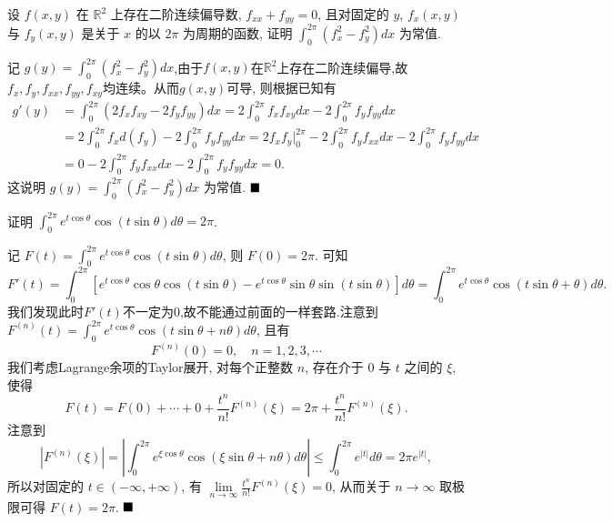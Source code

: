 \documentclass[lang=cn,newtx,10pt,scheme=chinese]{elegantbook}
\begin{document}
\begin{example}
设 $f(x, y)$ 在 $\mathbb{R}^2$ 上存在二阶连续偏导数, $f_{xx} + f_{yy} = 0$, 且对固定的 $y$, $f_x(x, y)$ 与 $f_y(x, y)$ 是关于 $x$ 的以 $2\pi$ 为周期的函数, 证明 $\int_{0}^{2\pi} (f_x^2 - f_y^2) dx$ 为常值.
\end{example}

\begin{solution}
记 $g(y) = \int_{0}^{2\pi} (f_x^2 - f_y^2) dx$,由于$f(x,y)$在$\mathbb R^2$上存在二阶连续偏导,故$f_x,f_y,f_{xx},f_{yy},f_{xy}$均连续。从而$g(x,y)$可导,
 则根据已知有
\begin{align*}
g'(y) &= \int_{0}^{2\pi} (2f_x f_{xy} - 2f_y f_{yy}) dx = 2 \int_{0}^{2\pi} f_x f_{xy} dx - 2 \int_{0}^{2\pi} f_y f_{yy} dx \\
&= \boxed{2 \int_{0}^{2\pi} f_x d(f_y)} - 2 \int_{0}^{2\pi} f_y f_{yy} dx = \boxed{2f_x f_y \Big|_{0}^{2\pi}} - 2 \int_{0}^{2\pi} f_y f_{xx} dx - 2 \int_{0}^{2\pi} f_y f_{yy} dx \\
&= 0 - 2 \int_{0}^{2\pi} f_y f_{xx} dx - 2 \int_{0}^{2\pi} f_y f_{yy} dx = 0.
\end{align*}
这说明 $g(y) = \int_{0}^{2\pi} (f_x^2 - f_y^2) dx$ 为常值.
$\hfill \blacksquare$
\end{solution}

\begin{example}
证明 $\int_{0}^{2\pi} e^{t \cos\theta} \cos(t \sin\theta) d\theta = 2\pi$.
\end{example}

\begin{solution}
记 $F(t) = \int_{0}^{2\pi} e^{t \cos\theta} \cos(t \sin\theta) d\theta$, 则 $F(0) = 2\pi$.  可知
$$F'(t) = \int_{0}^{2\pi} [e^{t \cos\theta} \cos\theta \cos(t \sin\theta) - e^{t \cos\theta} \sin\theta \sin(t \sin\theta)] d\theta = \int_{0}^{2\pi} e^{t \cos\theta} \cos(t \sin\theta + \theta) d\theta.$$
我们发现此时$F'(t)$不一定为0,故不能通过前面的一样套路.注意到 $F^{(n)}(t) = \int_{0}^{2\pi} e^{t \cos\theta} \cos(t \sin\theta + n\theta) d\theta$, 且有$$F^{(n)}(0) = 0, \quad n=1, 2, 3, \cdots$$
我们考虑Lagrange余项的Taylor展开, 对每个正整数 $n$, 存在介于 0 与 $t$ 之间的 $\xi$, 使得
\begin{equation*}
\boxed{F(t) = F(0) + \cdots + 0 + \frac{t^n}{n!}F^{(n)}(\xi) = 2\pi + \frac{t^n}{n!}F^{(n)}(\xi). }
\end{equation*}
注意到
$$|F^{(n)}(\xi)| = \left| \int_{0}^{2\pi} e^{\xi \cos\theta} \cos(\xi \sin\theta + n\theta) d\theta \right| \le \int_{0}^{2\pi} e^{|t|} d\theta = 2\pi e^{|t|},$$
所以对固定的 $t \in (-\infty, +\infty)$, 有 $\lim\limits_{n \to \infty} \frac{t^n}{n!} F^{(n)}(\xi) = 0$, 从而关于 $n \to \infty$ 取极限可得 $F(t) = 2\pi$.
$\hfill \blacksquare$
\end{solution}
\end{document}
